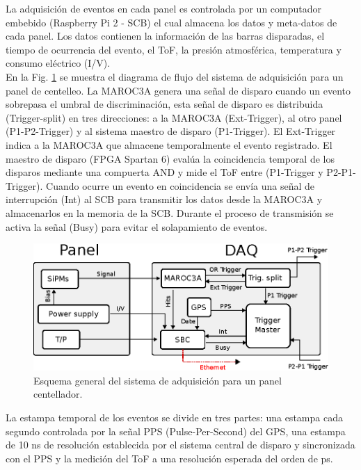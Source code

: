 La adquisición de eventos en cada panel es controlada por un computador embebido (Raspberry Pi 2 - SCB) el cual almacena los datos y meta-datos de cada panel. Los datos contienen la información de las barras disparadas, el tiempo de ocurrencia del evento, el ToF, la presión atmosférica, temperatura y consumo eléctrico (I/V).\\

En la Fig. \ref{DAQ} se muestra el diagrama de flujo del sistema de adquisición para un panel de centelleo. La MAROC3A genera una señal de disparo cuando un evento sobrepasa el umbral de discriminación, esta señal de disparo es distribuida (Trigger-split) en tres direcciones: a la MAROC3A (Ext-Trigger), al otro panel (P1-P2-Trigger) y al sistema maestro de disparo (P1-Trigger). El Ext-Trigger indica a la MAROC3A que almacene temporalmente el evento registrado. El maestro de disparo (FPGA Spartan 6) evalúa la coincidencia temporal de los disparos mediante una compuerta AND y mide el ToF entre (P1-Trigger y P2-P1-Trigger). Cuando ocurre un evento en coincidencia se envía una señal de interrupción (Int) al SCB para transmitir los datos desde la MAROC3A y almacenarlos en la memoria de la SCB. Durante el proceso de transmisión se activa la señal (Busy) para evitar el solapamiento de eventos.\\

\begin{figure}[h!]
\centering
\includegraphics[scale=1.2]{Figures/DAQ.eps}
\caption{Esquema general del sistema de adquisición para un panel centellador.}
\label{DAQ}
\end{figure}

La estampa temporal de los eventos se divide en tres partes: una estampa cada segundo controlada por la señal PPS (Pulse-Per-Second) del GPS, una estampa de 10 ns de resolución establecida por el sistema central de disparo y sincronizada con el PPS y la medición del ToF a una resolución esperada del orden de ps.\\

